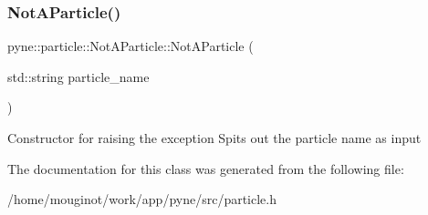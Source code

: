 \subsubsection{\texorpdfstring{Not\+A\+Particle()}{NotAParticle()}}
{\footnotesize\ttfamily pyne\+::particle\+::\+Not\+A\+Particle\+::\+Not\+A\+Particle (\begin{DoxyParamCaption}\item[{std\+::string}]{particle\+\_\+name }\end{DoxyParamCaption})\hspace{0.3cm}{\ttfamily [inline]}}

Constructor for raising the exception Spits out the particle name as input 

The documentation for this class was generated from the following file\+:\begin{DoxyCompactItemize}
\item 
/home/mouginot/work/app/pyne/src/particle.\+h\end{DoxyCompactItemize}
